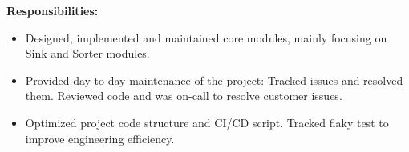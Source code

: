 \documentclass{software_engineer_rustin_liu}
\newcommand{\en}[1]{#1}
\newcommand{\zh}[1]{}
\begin{document}
\en{\textbf{Responsibilities:}}
\zh{\textbf{职责：}}
\begin{itemize}
      \item \en{Designed, implemented and maintained core modules, mainly focusing on Sink and Sorter modules.}
            \zh{设计、实现和维护核心模块，主要聚焦于 Sink 和 Sorter 模块。}
      \item \en{Provided day-to-day maintenance of the project: Tracked issues and resolved them. Reviewed code and was on-call to resolve customer issues.}
            \zh{项目日常的维护：Issues 追踪和解决、代码审阅和 on-call 解决客户问题。}
      \item \en{Optimized project code structure and CI/CD script. Tracked flaky test to improve engineering efficiency.}
            \zh{优化项目代码结构、追踪不稳定测试，优化 CI/CD 脚本，提升工程效率。}
\end{itemize}
\end{document}
